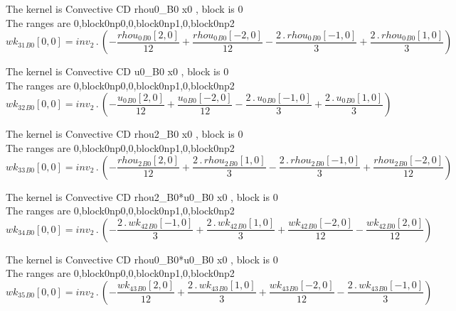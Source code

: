 \documentclass{article}
\begin{document}
\noindent The kernel is Convective CD rhou0_B0 x0 , block is 0\\\noindent The ranges are 0,block0np0,0,block0np1,0,block0np2\\\begin{dmath}{wk_{31}{_{B0}}}[{0,0}] = inv_2 \,.\, \left(- \frac{{rhou_{0}{_{B0}}}[{2,0}]}{12} + \frac{{rhou_{0}{_{B0}}}[{-2,0}]}{12} - \frac{2 \,.\, {rhou_{0}{_{B0}}}[{-1,0}]}{3} + \frac{2 \,.\, {rhou_{0}{_{B0}}}[{1,0}]}{3}\right)\end{dmath}

\noindent The kernel is Convective CD u0_B0 x0 , block is 0\\\noindent The ranges are 0,block0np0,0,block0np1,0,block0np2\\\begin{dmath}{wk_{32}{_{B0}}}[{0,0}] = inv_2 \,.\, \left(- \frac{{u_{0}{_{B0}}}[{2,0}]}{12} + \frac{{u_{0}{_{B0}}}[{-2,0}]}{12} - \frac{2 \,.\, {u_{0}{_{B0}}}[{-1,0}]}{3} + \frac{2 \,.\, {u_{0}{_{B0}}}[{1,0}]}{3}\right)\end{dmath}

\noindent The kernel is Convective CD rhou2_B0 x0 , block is 0\\\noindent The ranges are 0,block0np0,0,block0np1,0,block0np2\\\begin{dmath}{wk_{33}{_{B0}}}[{0,0}] = inv_2 \,.\, \left(- \frac{{rhou_{2}{_{B0}}}[{2,0}]}{12} + \frac{2 \,.\, {rhou_{2}{_{B0}}}[{1,0}]}{3} - \frac{2 \,.\, {rhou_{2}{_{B0}}}[{-1,0}]}{3} + \frac{{rhou_{2}{_{B0}}}[{-2,0}]}{12}\right)\end{dmath}

\noindent The kernel is Convective CD rhou2_B0*u0_B0 x0 , block is 0\\\noindent The ranges are 0,block0np0,0,block0np1,0,block0np2\\\begin{dmath}{wk_{34}{_{B0}}}[{0,0}] = inv_2 \,.\, \left(- \frac{2 \,.\, {wk_{42}{_{B0}}}[{-1,0}]}{3} + \frac{2 \,.\, {wk_{42}{_{B0}}}[{1,0}]}{3} + \frac{{wk_{42}{_{B0}}}[{-2,0}]}{12} - \frac{{wk_{42}{_{B0}}}[{2,0}]}{12}\right)\end{dmath}

\noindent The kernel is Convective CD rhou0_B0*u0_B0 x0 , block is 0\\\noindent The ranges are 0,block0np0,0,block0np1,0,block0np2\\\begin{dmath}{wk_{35}{_{B0}}}[{0,0}] = inv_2 \,.\, \left(- \frac{{wk_{43}{_{B0}}}[{2,0}]}{12} + \frac{2 \,.\, {wk_{43}{_{B0}}}[{1,0}]}{3} + \frac{{wk_{43}{_{B0}}}[{-2,0}]}{12} - \frac{2 \,.\, {wk_{43}{_{B0}}}[{-1,0}]}{3}\right)\end{dmath}
\end{document}
